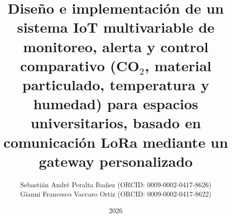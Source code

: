 \documentclass[a4paper,12pt,oneside]{tesisutec}
\begin{document}

\title{Diseño e implementación de un sistema IoT multivariable de monitoreo, alerta y control comparativo (CO\(_2\), material particulado, temperatura y humedad) para espacios universitarios, basado en comunicación LoRa mediante un gateway personalizado}


\author{
    Sebastián André Peralta Ibañez (ORCID: 0009-0002-0417-8626)\\
    Gianni Francesco Vaccaro Ortiz (ORCID: 0009-0002-0417-8622)
}%



\date{2026}

\maketitle

\frontmatter






\tableofcontents

\newpage

\listoftables

\newpage

\listoffigures


\mainmatter
\pagestyle{fancy}










\appendix

\end{document}
